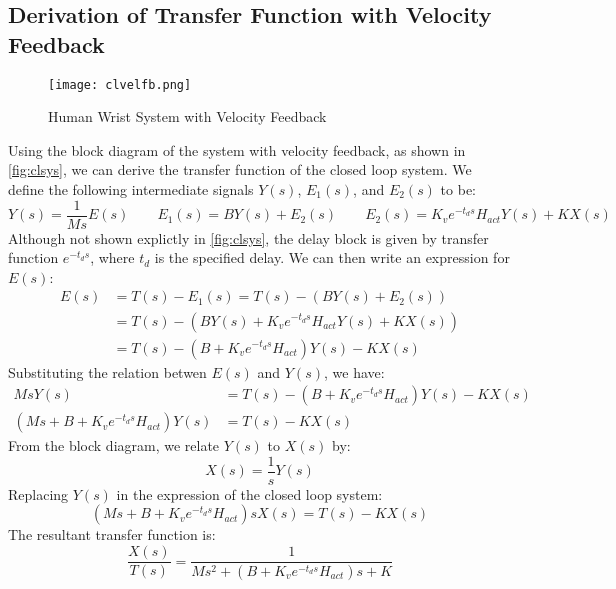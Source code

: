 \documentclass[11pt,a4paper]{article}
\begin{document}
\subsection{Derivation of Transfer Function with Velocity Feedback}
\begin{figure}
    \centering
    \texttt{[image: clvelfb.png]}
    \caption{Human Wrist System with Velocity Feedback}
    \label{fig:clsys}
\end{figure}
Using the block diagram of the system with velocity feedback, as shown in
\autoref{fig:clsys}, we can derive the transfer function of the closed loop
system. We define the following intermediate signals $Y(s)$, $E_1(s)$, and
$E_2(s)$ to be:
\begin{equation*}
    Y(s) = \frac{1}{Ms}E(s) \qquad E_1(s) = BY(s) + E_2(s) \qquad
    E_2(s) = K_v e^{-t_d s} H_{act} Y(s) + KX(s)
\end{equation*}
Although not shown explictly in \autoref{fig:clsys}, the delay block is given
by transfer function $ e^{-t_d s} $, where $t_d$ is the specified delay. We can
then write an expression for $E(s)$:
\begin{align*}
    E(s) &= T(s) - E_1(s) = T(s) - (BY(s) + E_2(s)) \\
         &= T(s) - (BY(s) + K_v e^{-t_d s} H_{act} Y(s) + KX(s)) \\
         &= T(s) - (B + K_v e^{-t_d s} H_{act}) Y(s) - KX(s)
\end{align*}
Substituting the relation betwen $E(s)$ and $Y(s)$, we have:
\begin{align*}
    Ms Y(s) &= T(s) - (B + K_v e^{-t_d s} H_{act}) Y(s) - KX(s) \\
    (Ms + B + K_v e^{-t_d s} H_{act}) Y(s) &= T(s) - KX(s)
\end{align*}
From the block diagram, we relate $Y(s)$ to $X(s)$ by:
\begin{equation*}
    X(s) = \frac{1}{s} Y(s)
\end{equation*}
Replacing $Y(s)$ in the expression of the closed loop system:
\begin{equation*}
    (Ms + B + K_v e^{-t_d s} H_{act}) s X(s) = T(s) - KX(s)
\end{equation*}
The resultant transfer function is:
\begin{equation*}
    \frac{X(s)}{T(s)} = \frac{1}{Ms^2 + (B + K_v e^{-t_d s} H_{act}) s  + K}
\end{equation*}

\end{document}
